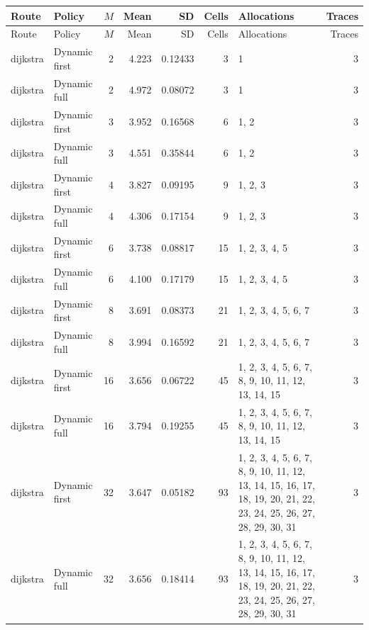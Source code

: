 \documentclass[10pt,a4paper]{article}
\begin{document}
\tiny\setlength{\tabcolsep}{2pt}\begin{longtable}{@{}p{23mm}p{29mm}rrrrp{36mm}r@{}}
\toprule Route & Policy & $M$ & Mean & SD & Cells & Allocations & Traces \\ \midrule\endfirsthead
\toprule Route & Policy & $M$ & Mean & SD & Cells & Allocations & Traces \\ \midrule\endhead
\bottomrule\endfoot
dijkstra & Dynamic first & 2 & 4.223 & 0.12433 & 3 & 1 & 3 \\
dijkstra & Dynamic full & 2 & 4.972 & 0.08072 & 3 & 1 & 3 \\
dijkstra & Dynamic first & 3 & 3.952 & 0.16568 & 6 & 1, 2 & 3 \\
dijkstra & Dynamic full & 3 & 4.551 & 0.35844 & 6 & 1, 2 & 3 \\
dijkstra & Dynamic first & 4 & 3.827 & 0.09195 & 9 & 1, 2, 3 & 3 \\
dijkstra & Dynamic full & 4 & 4.306 & 0.17154 & 9 & 1, 2, 3 & 3 \\
dijkstra & Dynamic first & 6 & 3.738 & 0.08817 & 15 & 1, 2, 3, 4, 5 & 3 \\
dijkstra & Dynamic full & 6 & 4.100 & 0.17179 & 15 & 1, 2, 3, 4, 5 & 3 \\
dijkstra & Dynamic first & 8 & 3.691 & 0.08373 & 21 & 1, 2, 3, 4, 5, 6, 7 & 3 \\
dijkstra & Dynamic full & 8 & 3.994 & 0.16592 & 21 & 1, 2, 3, 4, 5, 6, 7 & 3 \\
dijkstra & Dynamic first & 16 & 3.656 & 0.06722 & 45 & 1, 2, 3, 4, 5, 6, 7, 8, 9, 10, 11, 12, 13, 14, 15 & 3 \\
dijkstra & Dynamic full & 16 & 3.794 & 0.19255 & 45 & 1, 2, 3, 4, 5, 6, 7, 8, 9, 10, 11, 12, 13, 14, 15 & 3 \\
dijkstra & Dynamic first & 32 & 3.647 & 0.05182 & 93 & 1, 2, 3, 4, 5, 6, 7, 8, 9, 10, 11, 12, 13, 14, 15, 16, 17, 18, 19, 20, 21, 22, 23, 24, 25, 26, 27, 28, 29, 30, 31 & 3 \\
dijkstra & Dynamic full & 32 & 3.656 & 0.18414 & 93 & 1, 2, 3, 4, 5, 6, 7, 8, 9, 10, 11, 12, 13, 14, 15, 16, 17, 18, 19, 20, 21, 22, 23, 24, 25, 26, 27, 28, 29, 30, 31 & 3 \\
\end{longtable}\normalsize\setlength{\tabcolsep}{6pt}
\end{document}
